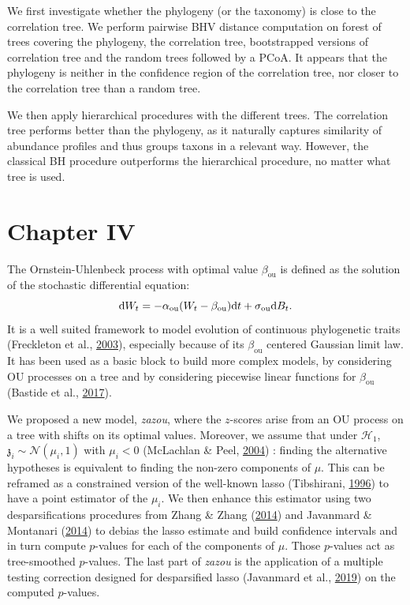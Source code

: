 \documentclass[12pt,a4paper]{reedthesis}
\newcommand \dx [2] [] {\mathrm{d}^{#1}\mspace{-1mu}\mathord{#2}}
\newcommand \normal [2] {\mathcal{N}\left({#1},{#2}\right)}
\newcommand \ou [1]{{#1}_{\text{ou}}}
\newcommand \zs {\mathfrak{z}}
\newcommand \optim {\beta}
\theoremstyle{definition}
\theoremstyle{definition}
\theoremstyle{definition}
\theoremstyle{remark}
\begin{document}
We first investigate whether the phylogeny (or the taxonomy) is close to the correlation tree. We perform pairwise BHV distance computation on forest of trees covering the phylogeny, the correlation tree, bootstrapped versions of correlation tree and the random trees followed by a PCoA. It appears that the phylogeny is neither in the confidence region of the correlation tree, nor closer to the correlation tree than a random tree.

We then apply hierarchical procedures with the different trees. The correlation tree performs better than the phylogeny, as it naturally captures similarity of abundance profiles and thus groups taxons in a relevant way. However, the classical BH procedure outperforms the hierarchical procedure, no matter what tree is used.

\hypertarget{chapter-iv}{%
\section*{Chapter IV}\label{chapter-iv}}

The Ornstein-Uhlenbeck process with optimal value \(\ou{\optim}\) is defined as the solution of the stochastic differential equation:
\begin{equation*}
\dx{W_t} = - \ou{\alpha} (W_t - \ou{\optim}) \dx{t} + \ou{\sigma}\dx{B_t}.
\end{equation*}
It is a well suited framework to model evolution of continuous phylogenetic traits (Freckleton et al., \protect\hyperlink{ref-freckleton2003bergmann}{2003}), especially because of its \(\ou{\optim}\) centered Gaussian limit law. It has been used as a basic block to build more complex models, by considering OU processes on a tree and by considering piecewise linear functions for \(\ou{\optim}\) (Bastide et al., \protect\hyperlink{ref-bastide2017detection}{2017}).

We proposed a new model, \emph{zazou}, where the \(z\)-scores arise from an OU process on a tree with shifts on its optimal values. Moreover, we assume that under \(\mathcal{H}_1\), \(\zs_i \sim \normal{\mu_i}{1}\) with \(\mu_i < 0\) (McLachlan \& Peel, \protect\hyperlink{ref-mclachlan2004finite}{2004}) : finding the alternative hypotheses is equivalent to finding the non-zero components of \(\mu\). This can be reframed as a constrained version of the well-known lasso (Tibshirani, \protect\hyperlink{ref-tibshirani1996regression}{1996}) to have a point estimator of the \(\mu_i\). We then enhance this estimator using two desparsifications procedures from Zhang \& Zhang (\protect\hyperlink{ref-zhang2014confidence}{2014}) and Javanmard \& Montanari (\protect\hyperlink{ref-javanmard2014confidence}{2014}) to debias the lasso estimate and build confidence intervals and in turn compute \(p\)-values for each of the components of \(\mu\). Those \(p\)-values act as tree-smoothed \(p\)-values. The last part of \emph{zazou} is the application of a multiple testing correction designed for desparsified lasso (Javanmard et al., \protect\hyperlink{ref-javanmard2019false}{2019}) on the computed \(p\)-values.
\end{document}
